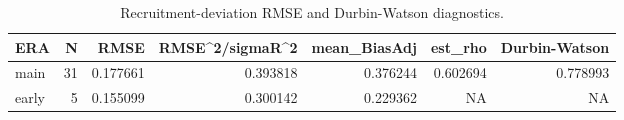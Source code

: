 \begin{table}

\caption{\label{tab:internal-rec-rmse}Recruitment-deviation RMSE and Durbin-Watson diagnostics.}
\centering
\begin{tabular}[t]{lrrrrrr}
\toprule
ERA & N & RMSE & RMSE\textasciicircum{}2/sigmaR\textasciicircum{}2 & mean\_BiasAdj & est\_rho & Durbin-Watson\\
\midrule
main & 31 & 0.177661 & 0.393818 & 0.376244 & 0.602694 & 0.778993\\
early & 5 & 0.155099 & 0.300142 & 0.229362 & NA & NA\\
\bottomrule
\end{tabular}
\end{table}

\begin{table}


\end{table}
